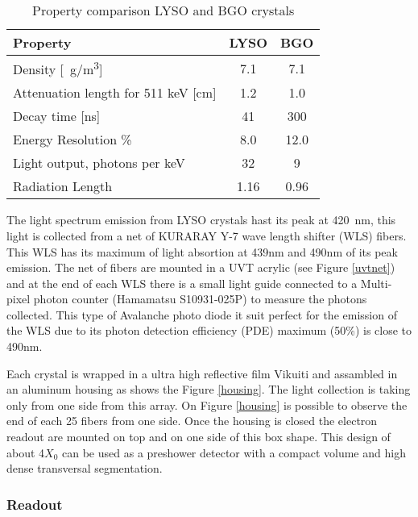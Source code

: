 \begin{table}[ht]\footnotesize
\centering
\begin{tabular*}{0.6\textwidth}{lcc}
Property & LYSO & BGO\\
\hline Density [\SI{}{g/m^3}]				& 7.1 	& 7.1 \\
Attenuation length for 511 keV [cm] & 1.2 	& 1.0\\
Decay time [ns]	 										& 41 		& 300\\
Energy Resolution \% 								& 8.0 	& 12.0\\
Light output, photons per keV 			& 32 		&	9 \\
Radiation Length										& 1.16 	& 0.96\\
\end{tabular*}
\caption{Property comparison LYSO and BGO crystals}\label{property}
\end{table}

The light spectrum emission from LYSO crystals hast its peak at \SI{420}{nm}, this light is collected from a net of
KURARAY Y-7  wave length shifter (WLS) fibers. This WLS has its maximum of light absortion at 439nm and 490nm of its
peak emission. The net of fibers are mounted in a UVT acrylic (see Figure \ref{uvtnet}) and at the end of each WLS there
is a small light guide connected to a Multi-pixel photon counter (Hamamatsu S10931-025P) to measure the photons
collected. This type of Avalanche photo diode it suit perfect for the emission of the WLS due to its photon detection
efficiency (PDE) maximum (50\%) is close to 490nm.\par 

Each crystal is wrapped in a ultra high reflective film Vikuiti and assambled in an aluminum housing as shows the Figure
\ref{housing}. The light collection is taking only from one side from this array. On Figure \ref{housing} is possible to
observe the end of each 25 fibers from one side. Once the housing is closed the electron readout are mounted on top and
on one side of this box shape. This design of about 4$X_0$ can be used as a preshower detector with a compact volume and
high dense transversal segmentation.  \par

\subsubsection{Readout}

